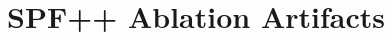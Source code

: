 \documentclass[11pt]{article}
\begin{document}
\section*{SPF++ Ablation Artifacts}



\end{document}
